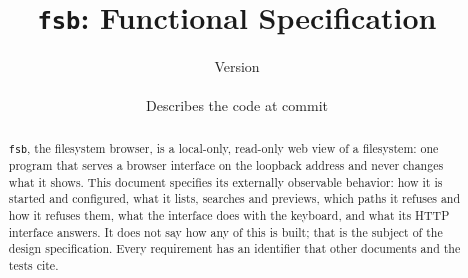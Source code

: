 \documentclass[11pt]{article}
\title{\texttt{fsb}: Functional Specification}
\author{}
\date{Version \fsbversion \\ \fsbcodedate \\ \small Describes the code at commit \texttt{\fsbcommit}}
\begin{document}
\maketitle
\begin{abstract}
\texttt{fsb}, the filesystem browser, is a local-only, read-only web view of a
filesystem: one program
that serves a browser interface on the loopback address and never changes what it
shows.  This document specifies its externally observable behavior: how it is
started and configured, what it lists, searches and previews, which paths it
refuses and how it refuses them, what the interface does with the keyboard, and
what its HTTP interface answers.  It does not say how any of this is built; that is
the subject of the design specification.  Every requirement has an identifier that
other documents and the tests cite.
\end{abstract}

\tableofcontents












\end{document}
